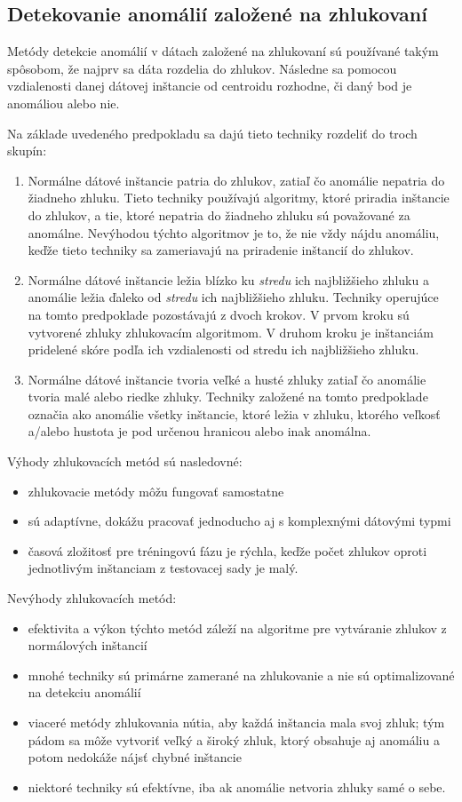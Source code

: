 \subsection{Detekovanie anomálií založené na zhlukovaní}
Metódy detekcie anomálií v dátach založené na zhlukovaní sú používané takým
spôsobom, že najprv sa dáta rozdelia do zhlukov. Následne sa
pomocou vzdialenosti danej dátovej inštancie od centroidu rozhodne, či daný  bod je 
anomáliou alebo nie.\par
Na základe uvedeného predpokladu sa dajú tieto techniky rozdeliť do troch skupín:
\begin{enumerate}
    \item Normálne dátové inštancie patria do zhlukov, zatiaľ čo anomálie nepatria do žiadneho
zhluku. Tieto techniky používajú algoritmy, ktoré priradia inštancie do zhlukov, a tie, ktoré nepatria do žiadneho zhluku sú považované za anomálne. Nevýhodou týchto algoritmov je to, že nie vždy nájdu anomáliu, keďže tieto techniky sa zameriavajú na priradenie inštancií do zhlukov.
\item Normálne dátové inštancie ležia blízko ku \emph{stredu} ich najbližšieho zhluku a anomálie ležia ďaleko od \emph{stredu} ich najbližšieho zhluku. Techniky operujúce na tomto predpoklade
pozostávajú z dvoch krokov. V prvom kroku sú vytvorené zhluky zhlukovacím algoritmom. V druhom kroku je inštanciám pridelené skóre podľa ich
vzdialenosti od stredu ich najbližšieho zhluku.
\item Normálne dátové inštancie tvoria veľké a husté zhluky zatiaľ čo anomálie tvoria
malé alebo riedke zhluky. Techniky založené na tomto predpoklade označia
ako anomálie všetky inštancie, ktoré ležia v zhluku, ktorého veľkosť a/alebo
hustota je pod určenou hranicou alebo inak anomálna. 
\end{enumerate}

Výhody zhlukovacích metód sú nasledovné:
\begin{itemize}
    \item zhlukovacie metódy môžu fungovať samostatne
    \item sú adaptívne, dokážu pracovať jednoducho aj s komplexnými dátovými typmi
    \item časová zložitosť pre tréningovú fázu je rýchla, keďže počet zhlukov oproti jednotlivým inštanciam z testovacej sady je malý.
\end{itemize}
Nevýhody zhlukovacích metód:
\begin{itemize}
    \item efektivita a výkon týchto metód záleží na algoritme pre vytváranie zhlukov z normálových inštancií
\item mnohé techniky sú primárne zamerané na zhlukovanie a nie sú optimalizované na detekciu anomálií
\item viaceré metódy zhlukovania nútia, aby každá inštancia mala svoj zhluk; tým pádom sa môže vytvoriť veľký a široký zhluk, ktorý obsahuje aj anomáliu a potom nedokáže nájsť chybné inštancie
\item niektoré techniky sú efektívne, iba ak anomálie netvoria zhluky samé o sebe.
\end{itemize}
\cite{Chandola}
